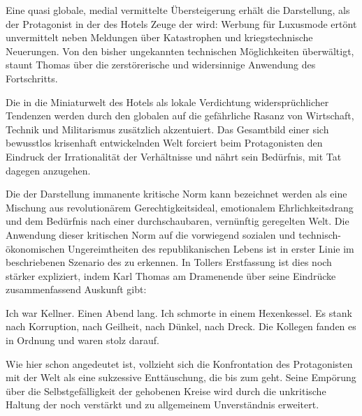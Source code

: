 Eine quasi globale, medial vermittelte Übersteigerung erhält die Darstellung,
als der Protagonist in der \Cite{Radiostation} des Hotels Zeuge der
\Cite{Nachrichten aus aller Welt}  wird: Werbung für
Luxusmode ertönt unvermittelt neben Meldungen über Katastrophen und
kriegstechnische Neuerungen. Von den bisher ungekannten technischen
Möglichkeiten überwältigt, staunt Thomas über die zerstörerische und
widersinnige Anwendung des Fortschritts.

Die  in die Miniaturwelt des Hotels als lokale Verdichtung
widersprüchlicher Tendenzen werden durch den globalen  auf die
gefährliche Rasanz von Wirtschaft, Technik und Militarismus zusätzlich
akzentuiert. Das Gesamtbild einer sich bewusstlos krisenhaft entwickelnden
Welt forciert beim Protagonisten den Eindruck der Irrationalität der
Verhältnisse und nährt sein Bedürfnis, mit  Tat dagegen
anzugehen.

Die der Darstellung immanente kritische Norm kann bezeichnet werden als eine
Mischung aus revolutionärem Gerechtigkeitsideal, emotionalem
Ehrlichkeitsdrang und dem Bedürfnis nach einer durchschaubaren, vernünftig
geregelten Welt. Die Anwendung dieser kritischen Norm auf die vorwiegend sozialen
und technisch-ökonomischen Ungereimtheiten des republikanischen Lebens ist in
erster Linie im beschriebenen Szenario des \Cite{Grand Hotel} zu erkennen.  In
Tollers Erstfassung ist dies noch stärker expliziert, indem Karl Thomas am
Dramenende über seine Eindrücke zusammenfassend Auskunft gibt:

\begin{BlockQuote}
Ich war Kellner. Einen Abend lang. Ich schmorte in einem Hexenkessel. Es stank
nach Korruption, nach Geilheit, nach Dünkel, nach Dreck. Die Kollegen fanden
es in Ordnung und waren stolz darauf. 
\end{BlockQuote}
Wie hier schon angedeutet ist, vollzieht sich die Konfrontation des
Protagonisten mit der Welt als eine sukzessive Enttäuschung, die bis zum
\Cite{Ekel}  geht. Seine Empörung über die
Selbstgefälligkeit der gehobenen Kreise wird durch die unkritische Haltung der
 noch verstärkt und zu allgemeinem Unverständnis
erweitert.

